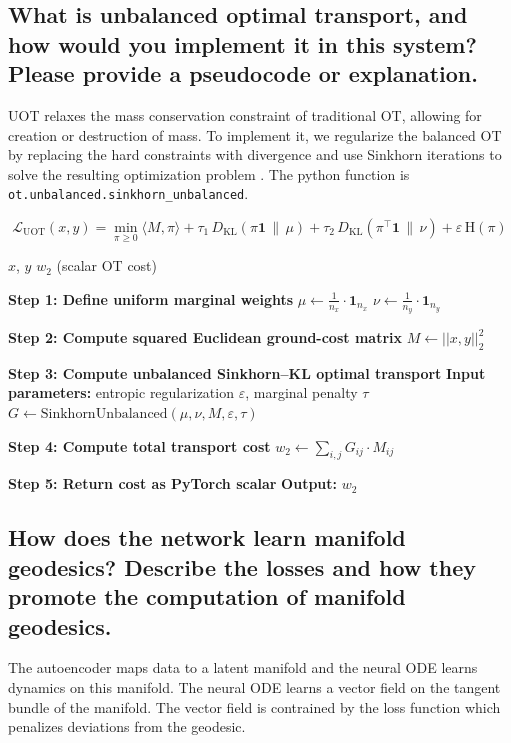 \documentclass[11pt]{article}
\begin{document}
\subsection{What is unbalanced optimal transport, and how would you implement it in this system?
Please provide a pseudocode or explanation.}
UOT relaxes the mass conservation constraint of traditional OT, allowing for creation or destruction of mass.
To implement it, we regularize the balanced OT by replacing the hard constraints with divergence
and use Sinkhorn iterations to solve the resulting optimization problem \cite{pmlr-v119-pham20a}. 
The python function is \texttt{ot.unbalanced.sinkhorn\_unbalanced}.

\[
\mathcal{L}_{\text{UOT}}(x, y)
= \min_{\pi \ge 0}
\langle M, \pi \rangle
+ \tau_1 \, D_{\mathrm{KL}}(\pi \mathbf{1} \,\|\, \mu)
+ \tau_2 \, D_{\mathrm{KL}}(\pi^{\top} \mathbf{1} \,\|\, \nu)
+ \varepsilon \, \mathrm{H}(\pi)
\]

\begin{algorithm}[H]
\caption{Unbalanced Optimal Transport Loss: \texttt{ot\_loss(x, y)}}
\begin{algorithmic}[1]
    \REQUIRE $x$, $y$ 
    \ENSURE $w_2$ (scalar OT cost)

    \STATE \textbf{Step 1: Define uniform marginal weights}
    \STATE $\mu \gets \frac{1}{n_{x}} \cdot \mathbf{1}_{n_{x}}$
    \STATE $\nu \gets \frac{1}{n_{y}} \cdot \mathbf{1}_{n_{y}}$

    \STATE \textbf{Step 2: Compute squared Euclidean ground-cost matrix}
    \STATE $M \gets {||x, y||}^2_2$

    \STATE \textbf{Step 3: Compute unbalanced Sinkhorn--KL optimal transport}
    \STATE \textbf{Input parameters:} entropic regularization $\varepsilon$, marginal penalty $\tau$
    \STATE $G \gets \text{SinkhornUnbalanced}(\mu, \nu, M, \varepsilon, \tau)$

    \STATE \textbf{Step 4: Compute total transport cost}
    \STATE $w_2 \gets \sum_{i,j} G_{ij} \cdot M_{ij}$

    \STATE \textbf{Step 5: Return cost as PyTorch scalar}
    \STATE \textbf{Output:} $w_2$

\end{algorithmic}
\end{algorithm}


\subsection{How does the network learn manifold geodesics? Describe the losses and how they
promote the computation of manifold geodesics.}
The autoencoder maps data to a latent manifold and the neural ODE learns dynamics on this manifold. 
The neural ODE learns a vector field on the tangent bundle of the manifold. The vector field is contrained 
by the loss function which penalizes deviations from the geodesic. 
\end{document}
